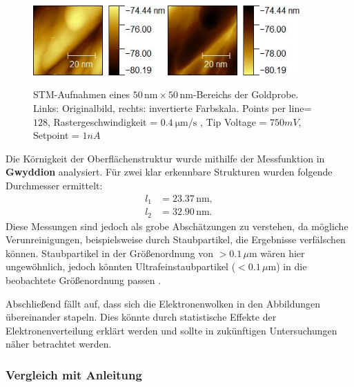 \documentclass{article}
\begin{document}
\begin{figure}[h!]
    \centering
    \includegraphics[width=0.45\textwidth]{figure/Gold_mess_3.jpg}
    \hfill
    \includegraphics[width=0.45\textwidth]{figure/Gold_mess_invb.jpg}
    \caption{STM-Aufnahmen eines $50 \, \text{nm} \times 50 \, \text{nm}$-Bereichs der Goldprobe. Links: Originalbild, rechts: invertierte Farbskala. Points per line=$128$, Rastergeschwindigkeit = $ \SI{0.4}{\um \per \s}$ , Tip  Voltage = $750mV$, Setpoint = $1nA$}
    \label{fig:gold-probeb}
\end{figure}

Die Körnigkeit der Oberflächenstruktur wurde mithilfe der Messfunktion in \textbf{Gwyddion} analysiert. Für zwei klar erkennbare Strukturen wurden folgende Durchmesser ermittelt:
\begin{align*}
    l_1 &= 23.37 \, \text{nm}, \\
    l_2 &= 32.90 \, \text{nm}.
\end{align*}
Diese Messungen sind jedoch als grobe Abschätzungen zu verstehen, da mögliche Verunreinigungen, beispielsweise durch Staubpartikel, die Ergebnisse verfälschen können. Staubpartikel in der Größenordnung von $>0.1 \, \mu\text{m}$ wären hier ungewöhnlich, jedoch könnten Ultrafeinstaubpartikel ($<0.1 \, \mu\text{m}$) in die beobachtete Größenordnung passen \cite{feinstaub}.

Abschließend fällt auf, dass sich die Elektronenwolken in den Abbildungen übereinander stapeln. Dies könnte durch statistische Effekte der Elektronenverteilung erklärt werden und sollte in zukünftigen Untersuchungen näher betrachtet werden.

\subsubsection*{Vergleich mit Anleitung}
\end{document}
